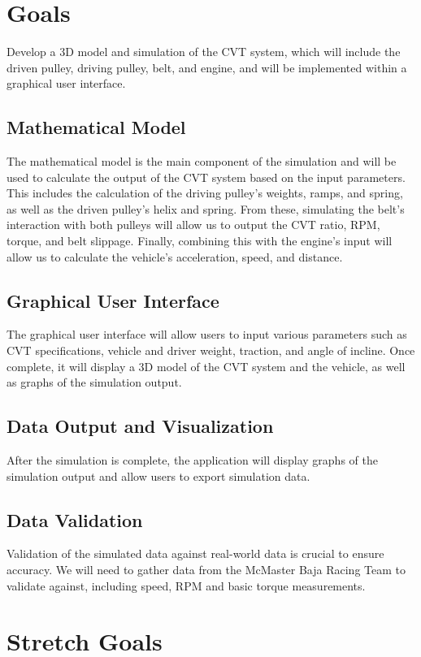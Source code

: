 \documentclass{article}
\begin{document}
\section{Goals}

Develop a 3D model and simulation of the CVT system, which will include the driven pulley, 
driving pulley, belt, and engine, and will be implemented within a graphical user interface.

\subsection{Mathematical Model}
The mathematical model is the main component of the simulation and will be used to 
calculate the output of the CVT system based on the input parameters.
This includes the calculation of the driving pulley's weights, ramps, and spring, 
as well as the driven pulley's helix and spring.
From these, simulating the belt's interaction with both pulleys will allow us to output 
the CVT ratio, RPM, torque, and belt slippage. Finally, combining this with the engine's input
will allow us to calculate the vehicle's acceleration, speed, and distance.

\subsection{Graphical User Interface}
The graphical user interface will allow users to input various parameters such as CVT specifications, 
vehicle and driver weight, traction, and angle of incline. Once complete, it will display a 3D model
of the CVT system and the vehicle, as well as graphs of the simulation output.

\subsection{Data Output and Visualization}
After the simulation is complete, the application will display graphs of the simulation output 
and allow users to export simulation data.

\subsection{Data Validation}
Validation of the simulated data against real-world data is crucial to ensure accuracy. 
We will need to gather data from the McMaster Baja Racing Team to validate against, including 
speed, RPM and basic torque measurements.

\section{Stretch Goals}
\end{document}
